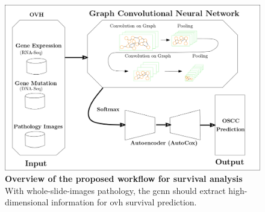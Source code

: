 \documentclass[12pt, a4paper]{article}
\newcommand{\bcaption}[2]{\caption{\textbf{#1} #2}}
\begin{document}
\begin{figure}[hp]
\centering
\includegraphics[width=14cm]{GCNN_survival_AutoCox.png}
\bcaption{Overview of the proposed workflow for survival analysis}
{\\
With whole-slide-images pathology, the \acrfull{gcnn} should extract high-dimensional information for \acrshort{ovh} survival prediction.}
\label{fig:GCNN}
\end{figure}





\end{document}
